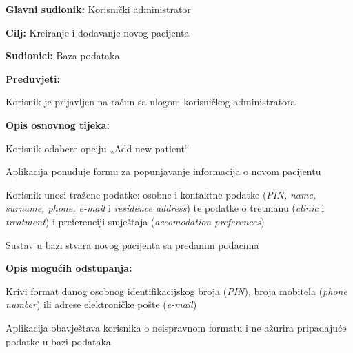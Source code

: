 					\noindent {}
					\begin{packed_item}
						\item \textbf{Glavni sudionik:} Korisnički administrator
						\item  \textbf{Cilj:} Kreiranje i dodavanje novog pacijenta
						\item  \textbf{Sudionici:} Baza podataka
						\item  \textbf{Preduvjeti:}
						\item[] \begin{packed_enum}
							\item Korisnik je prijavljen na račun sa ulogom korisničkog administratora
						\end{packed_enum}
						
						\item  \textbf{Opis osnovnog tijeka:}
						\item[] \begin{packed_enum}
							\item Korisnik odabere opciju „Add new patient“
							\item Aplikacija ponuđuje formu za popunjavanje informacija o novom pacijentu
							\item Korisnik unosi tražene podatke: osobne i kontaktne podatke (\textit{PIN, name, surname, phone, e-mail} i \textit{residence address}) te podatke o tretmanu (\textit{clinic} i \textit{treatment}) i preferenciji smještaja (\textit{accomodation preferences})
							\item Sustav u bazi stvara novog pacijenta sa predanim podacima
						\end{packed_enum}
						
						\item  \textbf{Opis mogućih odstupanja:}
						\item[] \begin{packed_item}
							\item[3.a] Krivi format danog osobnog identifikacijskog broja (\textit{PIN}), broja mobitela (\textit{phone number}) ili adrese elektroničke pošte (\textit{e-mail})
							\item[] \begin{packed_enum}
								\item Aplikacija obavještava korisnika o neispravnom formatu i ne ažurira pripadajuće podatke u bazi podataka
							\end{packed_enum}
						\end{packed_item}
					\end{packed_item}
					

